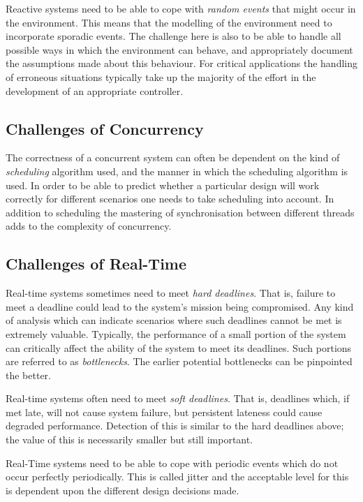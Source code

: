 \documentclass{overturerepchap}
\begin{document}
Reactive systems need to be able to cope with \emph{random events} that might
occur in the environment. This means that the modelling of the
environment need to incorporate sporadic events. The challenge here is
also to be able to handle all possible ways in which the environment
can behave, and appropriately document the assumptions made about this 
behaviour. For critical applications the handling of erroneous
situations typically take up the majority of the effort in the
development of an appropriate controller.

\subsection{Challenges of Concurrency}

The correctness of a concurrent system can often be dependent on the
kind of \emph{scheduling} algorithm used, and the manner in which the
scheduling algorithm is used. In order to be able to predict whether a
particular design will work correctly for different scenarios one
needs to take scheduling into account. In addition to scheduling the 
mastering of synchronisation between different threads adds to the
complexity of concurrency.

\subsection{Challenges of Real-Time}

Real-time systems sometimes need to meet \emph{hard deadlines}. That
is, failure to meet a deadline could lead to the system's mission
being compromised. Any kind of analysis which can indicate scenarios
where such deadlines cannot be met is extremely valuable.  Typically,
the performance of a small portion of the system can critically affect
the ability of the system to meet its deadlines. Such portions are
referred to as \emph{bottlenecks}.  The earlier potential bottlenecks
can be pinpointed the better.

Real-time systems often need to meet \emph{soft deadlines}. That is,
deadlines which, if met late, will not cause system failure, but
persistent lateness could cause degraded performance. Detection of
this is similar to the hard deadlines above; the value of this is
necessarily smaller but still important.

Real-Time systems need to be able to cope with periodic events which
do not occur perfectly periodically. This is called jitter and the
acceptable level for this is dependent upon the different design
decisions made.
\end{document}
